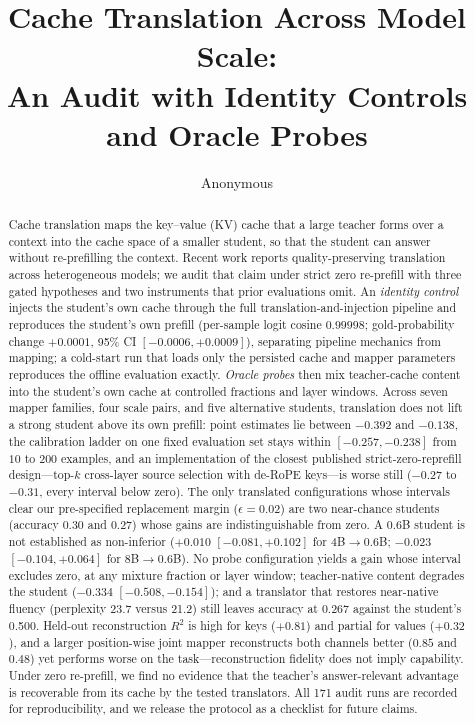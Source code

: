 \documentclass{article} %
\title{Cache Translation Across Model Scale:\\
An Audit with Identity Controls and Oracle Probes}
\author{Anonymous}
\date{}
\begin{document}
\maketitle

\begin{abstract}
Cache translation maps the key--value (KV) cache that a large teacher forms
over a context into the cache space of a smaller student, so that the student
can answer without re-prefilling the context. Recent work reports
quality-preserving translation across heterogeneous models; we audit that claim
under strict zero re-prefill with three gated hypotheses and two instruments
that prior evaluations omit. An \emph{identity control} injects the student's
own cache through the full translation-and-injection pipeline and reproduces
the student's own prefill (per-sample logit cosine $0.99998$; gold-probability
change $+0.0001$, 95\% CI $[-0.0006, +0.0009]$), separating pipeline mechanics
from mapping; a cold-start run that loads only the persisted cache and mapper
parameters reproduces the offline evaluation exactly. \emph{Oracle probes} then mix teacher-cache content into the
student's own cache at controlled fractions and layer windows. Across seven
mapper families, four scale pairs, and five alternative students, translation
does not lift a strong student above its own
prefill: point estimates lie between $-0.392$ and $-0.138$, the calibration
ladder on one fixed evaluation set stays within $[-0.257, -0.238]$ from $10$ to
$200$ examples, and an implementation of the closest published
strict-zero-reprefill design---top-$k$ cross-layer source selection with
de-RoPE keys---is worse still ($-0.27$ to $-0.31$, every interval below zero).
The only translated configurations whose intervals clear our pre-specified
replacement margin ($\epsilon{=}0.02$) are two near-chance students (accuracy
$0.30$ and $0.27$) whose gains are indistinguishable from zero. A 0.6B student is not established as
non-inferior ($+0.010$ $[-0.081, +0.102]$ for 4B$\to$0.6B; $-0.023$
$[-0.104, +0.064]$ for 8B$\to$0.6B). No probe configuration yields a gain whose
interval excludes zero, at any mixture fraction or layer window; teacher-native
content degrades the student ($-0.334$ $[-0.508, -0.154]$); and a translator
that restores near-native fluency (perplexity 23.7 versus 21.2) still leaves
accuracy at 0.267 against the student's 0.500. Held-out reconstruction $R^2$ is
high for keys ($+0.81$) and partial for values ($+0.32$), and a larger
position-wise joint mapper reconstructs both channels better ($0.85$ and $0.48$)
yet performs worse on the task---reconstruction fidelity does not imply
capability. Under zero
re-prefill, we find no evidence that the teacher's answer-relevant advantage is
recoverable from its cache by the tested translators. All 171 audit runs are
recorded for reproducibility, and we release the protocol as a checklist for
future claims.
\end{abstract}
\end{document}
